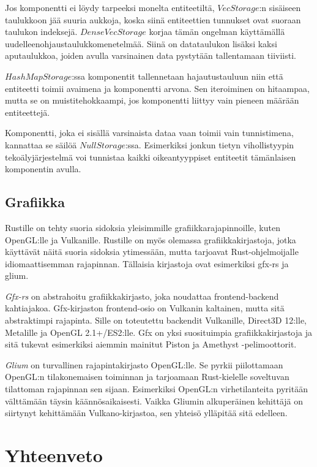 \documentclass[finnish]{tktltiki2}
\theoremstyle{definition}
\theoremstyle{remark}
\begin{document}
Jos komponentti ei löydy tarpeeksi monelta entiteetiltä, $VecStorage$:n sisäiseen taulukkoon jää suuria aukkoja, koska siinä entiteettien tunnukset ovat suoraan taulukon indeksejä. $DenseVecStorage$ korjaa tämän ongelman käyttämällä uudelleenohjaustaulukkomenetelmää. Siinä on datataulukon lisäksi kaksi aputaulukkoa, joiden avulla varsinainen data pystytään tallentamaan tiiviisti.

$HashMapStorage$:ssa komponentit tallennetaan hajautustauluun niin että entiteetti toimii avaimena ja komponentti arvona. Sen iteroiminen on hitaampaa, mutta se on muistitehokkaampi, jos komponentti liittyy vain pieneen määrään entiteettejä.  

Komponentti, joka ei sisällä varsinaista dataa vaan toimii vain tunnistimena, kannattaa se säilöä $NullStorage$:ssa. Esimerkiksi jonkun tietyn vihollistyypin tekoälyjärjestelmä voi tunnistaa kaikki oikeantyyppiset entiteetit tämänlaisen komponentin avulla. 

\subsection{Grafiikka}

Rustille on tehty suoria sidoksia yleisimmille grafiikkarajapinnoille, kuten OpenGL:lle ja Vulkanille. Rustille on myös olemassa grafiikkakirjastoja, jotka käyttävät näitä suoria sidoksia ytimessään, mutta tarjoavat Rust-ohjelmoijalle idiomaattisemman rajapinnan. Tällaisia kirjastoja ovat esimerkiksi gfx-rs ja glium.

\textit{Gfx-rs} on abstrahoitu grafiikkakirjasto, joka noudattaa frontend-backend kahtiajakoa. Gfx-kirjaston frontend-osio on Vulkanin kaltainen, mutta sitä abstraktimpi rajapinta. Sille on toteutettu backendit Vulkanille, Direct3D 12:lle, Metalille ja OpenGL 2.1+/ES2:lle. Gfx on yksi suosituimpia grafiikkakirjastoja ja sitä tukevat esimerkiksi aiemmin mainitut Piston ja Amethyst -pelimoottorit.

\textit{Glium} on turvallinen rajapintakirjasto OpenGL:lle. Se pyrkii piilottamaan OpenGL:n tilakonemaisen toiminnan ja tarjoamaan Rust-kielelle soveltuvan tilattoman rajapinnan sen sijaan. Esimerkiksi OpenGL:n virhetilanteita pyritään välttämään täysin käännösaikaisesti. Vaikka Gliumin alkuperäinen kehittäjä on siirtynyt kehittämään Vulkano-kirjastoa, sen yhteisö ylläpitää sitä edelleen.

\section{Yhteenveto}
\end{document}
